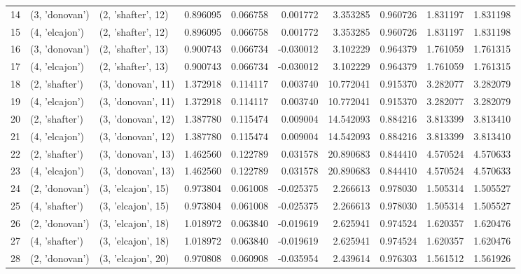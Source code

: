 \begin{tabular}{lllrrrrrrr}
14 &   (3, 'donovan') &  (2, 'shafter', 12) &  0.896095 &   0.066758 &  0.001772 &   3.353285 &  0.960726 &   1.831197 &  1.831198 \\
15 &   (4, 'elcajon') &  (2, 'shafter', 12) &  0.896095 &   0.066758 &  0.001772 &   3.353285 &  0.960726 &   1.831197 &  1.831198 \\
16 &   (3, 'donovan') &  (2, 'shafter', 13) &  0.900743 &   0.066734 & -0.030012 &   3.102229 &  0.964379 &   1.761059 &  1.761315 \\
17 &   (4, 'elcajon') &  (2, 'shafter', 13) &  0.900743 &   0.066734 & -0.030012 &   3.102229 &  0.964379 &   1.761059 &  1.761315 \\
18 &   (2, 'shafter') &  (3, 'donovan', 11) &  1.372918 &   0.114117 &  0.003740 &  10.772041 &  0.915370 &   3.282077 &  3.282079 \\
19 &   (4, 'elcajon') &  (3, 'donovan', 11) &  1.372918 &   0.114117 &  0.003740 &  10.772041 &  0.915370 &   3.282077 &  3.282079 \\
20 &   (2, 'shafter') &  (3, 'donovan', 12) &  1.387780 &   0.115474 &  0.009004 &  14.542093 &  0.884216 &   3.813399 &  3.813410 \\
21 &   (4, 'elcajon') &  (3, 'donovan', 12) &  1.387780 &   0.115474 &  0.009004 &  14.542093 &  0.884216 &   3.813399 &  3.813410 \\
22 &   (2, 'shafter') &  (3, 'donovan', 13) &  1.462560 &   0.122789 &  0.031578 &  20.890683 &  0.844410 &   4.570524 &  4.570633 \\
23 &   (4, 'elcajon') &  (3, 'donovan', 13) &  1.462560 &   0.122789 &  0.031578 &  20.890683 &  0.844410 &   4.570524 &  4.570633 \\
24 &   (2, 'donovan') &  (3, 'elcajon', 15) &  0.973804 &   0.061008 & -0.025375 &   2.266613 &  0.978030 &   1.505314 &  1.505527 \\
25 &   (4, 'shafter') &  (3, 'elcajon', 15) &  0.973804 &   0.061008 & -0.025375 &   2.266613 &  0.978030 &   1.505314 &  1.505527 \\
26 &   (2, 'donovan') &  (3, 'elcajon', 18) &  1.018972 &   0.063840 & -0.019619 &   2.625941 &  0.974524 &   1.620357 &  1.620476 \\
27 &   (4, 'shafter') &  (3, 'elcajon', 18) &  1.018972 &   0.063840 & -0.019619 &   2.625941 &  0.974524 &   1.620357 &  1.620476 \\
28 &   (2, 'donovan') &  (3, 'elcajon', 20) &  0.970808 &   0.060908 & -0.035954 &   2.439614 &  0.976303 &   1.561512 &  1.561926 \\

\end{tabular}
